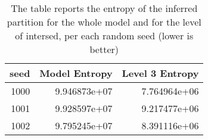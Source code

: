 \begin{table}[tb]
\centering
\caption[Model and level entropy]{The table reports the entropy of the inferred partition for the whole model and for the level of intersed, per each random seed (lower is better)}
\label{tab:entropy}
\begin{tabular}{rrr}
\toprule
 seed &  Model Entropy &  Level 3 Entropy \\
\midrule
 1000 &   9.946873e+07 &     7.764964e+06 \\
 1001 &   9.928597e+07 &     9.217477e+06 \\
 1002 &   9.795245e+07 &     8.391116e+06 \\
\bottomrule
\end{tabular}
\end{table}
